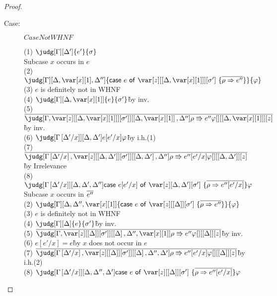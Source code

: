 \begin{proof}
\begin{description}
\item[Case:] $CaseNotWHNF$
\begin{tabbing}
  (1) $\judg[\G][\D']{e'}{\s}$\\
  Subcase $x$ occurs in $e$\\
    (2) $\judg[\G][\D,\xl,\D'']{\ccase{e}{\z[\irr{\D,\xl}][\s']~\{\ov{\rho\Rightarrow e''}\}}}{\vp}$\\
    (3) $e$ is definitely not in WHNF\\
    (4) $\judg[\G][\D,\xl]{e}{\s'}$\`by inv.\\
    (5) $\ov{\judg[\G,\zr{\irr{\D,\xl}}{\s'}][\irr{\D,\xl},\D'']{\rho\Rrightarrow e''}{\vp}[][\irr{\D,\xl}][z]}$\`by inv.\\
    (6) $\judg[\subst{\G}{\D'}{x}][\D,\D']{e[e'/x]}{\vp}$\`by i.h.(1)\\
    (7) $\ov{\judg[\subst{\G}{\D'}{x},\zr{\irr{\D,\D'}}{\s'}][\irr{\D,\D'},\D'']{\rho\Rrightarrow e''[e'/x]}{ \vp}[][\irr{\D,\D'}][z]}$ \` by Irrelevance\\
    (8) $\judg[\subst{\G}{\D'}{x}][\D,\D',\D'']{\ccase{e[e'/x]}{\z[\D,\D'][\s']~\{\ov{\rho\Rightarrow e''[e'/x]}\}}}{\vp}$\\
  Subcase $x$ occurs in $\overline{e''}$\\
    (2) $\judg[\G][\D,\D'',\xl]{\ccase{e}{\z[\irr{\D}][\s']~\{\ov{\rho\Rightarrow e''}\}}}{\vp}$\\
    (3) $e$ is definitely not in WHNF\\
    (4) $\judg[\G][\D]{e}{\s'}$\`by inv.\\
    (5) $\ov{\judg[\G,\zr{\irr{\D}}{\s'}][\irr{\D},\D'',\xl]{\rho\Rrightarrow e''}{ \vp}[][\irr{\D}][z]}$\`by inv.\\
    (6) $e[e'/x] = e$\` by $x$ does not occur in $e$\\
    (7) $\ov{\judg[\subst{\G}{\D'}{x},\zr{\irr{\D}}{\s'}][\irr{\D},\D'',\D']{\rho\Rrightarrow e''[e'/x]}{\vp}[][\irr{\D}][z]}$\`by i.h.(2)\\
    (8) $\judg[\subst{\G}{\D'}{x}][\D,\D'',\D']{\ccase{e}{\z[\irr{\D}][\s']~\{\ov{\rho\Rightarrow e''[e'/x]}\}}}{\vp}$\\
\end{tabbing}


\end{description}
\end{proof}
